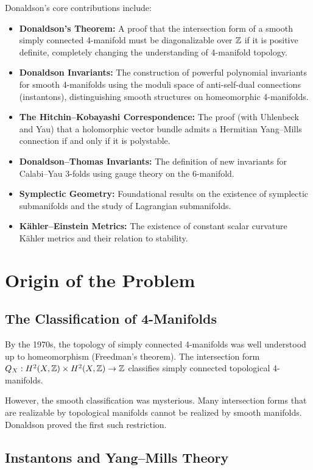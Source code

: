 Donaldson's core contributions include:
\begin{itemize}
    \item \textbf{Donaldson's Theorem:} A proof that the intersection form of a smooth simply connected 4-manifold must be diagonalizable over $\mathbb{Z}$ if it is positive definite, completely changing the understanding of 4-manifold topology.
    \item \textbf{Donaldson Invariants:} The construction of powerful polynomial invariants for smooth 4-manifolds using the moduli space of anti-self-dual connections (instantons), distinguishing smooth structures on homeomorphic 4-manifolds.
    \item \textbf{The Hitchin--Kobayashi Correspondence:} The proof (with Uhlenbeck and Yau) that a holomorphic vector bundle admits a Hermitian Yang--Mills connection if and only if it is polystable.
    \item \textbf{Donaldson--Thomas Invariants:} The definition of new invariants for Calabi--Yau 3-folds using gauge theory on the 6-manifold.
    \item \textbf{Symplectic Geometry:} Foundational results on the existence of symplectic submanifolds and the study of Lagrangian submanifolds.
    \item \textbf{K\"ahler--Einstein Metrics:} The existence of constant scalar curvature K\"ahler metrics and their relation to stability.
\end{itemize}

\section{Origin of the Problem}

\subsection{The Classification of 4-Manifolds}

By the 1970s, the topology of simply connected 4-manifolds was well understood up to homeomorphism (Freedman's theorem). The intersection form $Q_X: H^2(X,\mathbb{Z}) \times H^2(X,\mathbb{Z}) \to \mathbb{Z}$ classifies simply connected topological 4-manifolds.

However, the smooth classification was mysterious. Many intersection forms that are realizable by topological manifolds cannot be realized by smooth manifolds. Donaldson proved the first such restriction.

\subsection{Instantons and Yang--Mills Theory}

